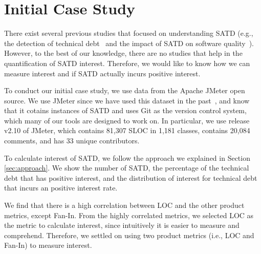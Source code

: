 
\section{Initial Case Study} \label{sec:results}
There exist several previous studies that focused on understanding SATD (e.g., the detection of technical debt~\cite{Potdar2014ICSME,Zazworka2013EASE} and the impact of SATD on software quality~\cite{Wehaibi2016SANER}). However, to the best of our knowledge, there are no studies that help in the quantification of SATD interest. Therefore, we would like to know how we can measure interest and if SATD actually incurs positive interest.

To conduct our initial case study, we use data from the Apache JMeter open source. We use JMeter since we have used this dataset in the past~\cite{Maldonado2015MTD,Potdar2014ICSME}, and know that it cotains instances of SATD and uses Git as the version control system, which many of our tools are designed to work on. In particular, we use release v2.10 of JMeter, which contains 81,307 SLOC in 1,181 classes, contains 20,084 comments, and has 33 unique contributors.





To calculate interest of SATD, we follow the approach we explained in Section \ref{sec:approach}.
We show the number of SATD, the percentage of the technical debt that has positive interest, and the distribution of interest for technical debt that incurs an positive interest rate.

We find that there is a high correlation between LOC and the other product metrics, except Fan-In. From the highly correlated metrics, we selected LOC as the metric to calculate interest, since intuitively it is easier to measure and comprehend. Therefore, we settled on using two product metrics (i.e., LOC and Fan-In) to measure interest.

